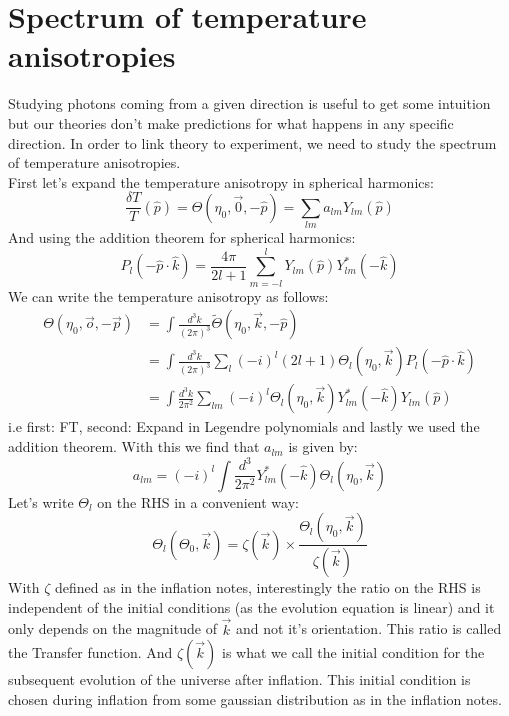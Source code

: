 \documentclass{article}
\begin{document}
\section{Spectrum of temperature anisotropies}
Studying photons coming from a given direction is useful to get some intuition but our theories don't make predictions for what happens in any specific direction. In order to link theory to experiment, we need to study the spectrum of temperature anisotropies.\\
First let's expand the temperature anisotropy in spherical harmonics:
\begin{equation}
  \frac{\delta T}{T}(\hat{p}) = \Theta(\eta_0,\vec{0},-\hat{p}) = \sum_{lm}a_{lm}Y_{lm}(\hat{p})
\end{equation}
And using the addition theorem for spherical harmonics:
\begin{equation}
  P_l(-\hat{p}\cdot \hat{k}) = \frac{4\pi}{2l + 1}\sum_{m=-l}^l Y_{lm}(\hat{p})Y^*_{lm}(-\hat{k})
\end{equation}
We can write the temperature anisotropy as follows:
\begin{align}
  \Theta(\eta_0,\vec{o},-\vec{p}) &= \int \frac{d^3 k}{(2\pi)^3}\tilde{\Theta}(\eta_0,\vec{k},-\hat{p})\\
                                  &= \int \frac{d^3 k}{(2\pi)^3} \sum_l (-i)^l (2l + 1)\Theta_l(\eta_0,\vec{k})P_l(-\hat{p}\cdot\hat{k})\\
                                  &= \int \frac{d^3 k}{2\pi^2} \sum_{lm} (-i)^l\Theta_l(\eta_0,\vec{k}) Y_{lm}^*(-\hat{k})Y_{lm}(\hat{p})
\end{align}
i.e first: FT, second: Expand in Legendre polynomials and lastly we used the addition theorem. With this we find that $a_{lm}$ is given by:
\begin{equation}
  a_{lm} = (-i)^l \int \frac{d^3}{2\pi^2}Y_{lm}^*(-\hat{k})\Theta_l(\eta_0,\vec{k})
\end{equation}
Let's write $\Theta_l$ on the RHS in a convenient way:
\begin{equation}
  \Theta_l(\Theta_0,\vec{k}) = \zeta(\vec{k})\times \frac{\Theta_l(\eta_0,\vec{k})}{\zeta(\vec{k})}
\end{equation}
With $\zeta$ defined as in the inflation notes, interestingly the ratio on the RHS is independent of the initial conditions (as the evolution equation is linear) and it only depends on the magnitude of $\vec{k}$ and not it's orientation. This ratio is called the Transfer function. And $\zeta(\vec{k})$ is what we call the initial condition for the subsequent evolution of the universe after inflation. This initial condition is chosen during inflation from some gaussian distribution as in the inflation notes.\\
\end{document}
